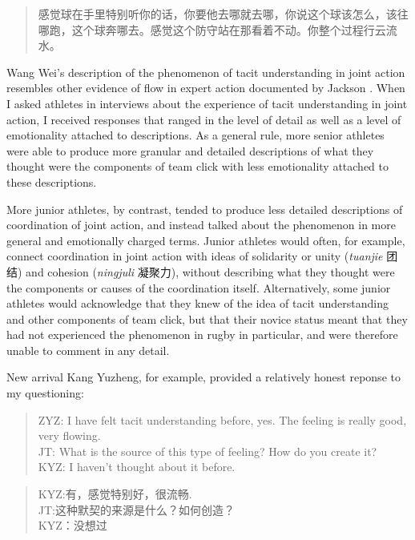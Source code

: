 \begin{CJK}{UTF8}{gbsn}
  \begin{quote}
    	感觉球在手里特别听你的话，你要他去哪就去哪，你说这个球该怎么，该往哪跑，这个球奔哪去。感觉这个防守站在那看着不动。你整个过程行云流水。
  \end{quote}

Wang Wei's description of the phenomenon of tacit understanding in joint action resembles other evidence of flow in expert action documented by Jackson \textcite{Jackson1992}.  When I asked athletes in interviews about the experience of tacit understanding in joint action, I received responses that ranged in the level of detail as well as a level of emotionality attached to descriptions.  As a general rule, more senior athletes were able to produce more granular and detailed descriptions of what they thought were the components of team click with less emotionality attached to these descriptions.

More junior athletes, by contrast, tended to produce less detailed descriptions of coordination of joint action, and instead talked about the phenomenon in more general and emotionally charged terms. Junior athletes would often, for example, connect coordination in joint action with ideas of solidarity or unity (\textit{tuanjie} 团结) and cohesion (\textit{ningjuli} 凝聚力), without describing what they thought were the components or causes of the coordination itself.  Alternatively, some junior athletes would acknowledge that they knew of the idea of tacit understanding and other components of team click, but that their novice status meant that they had not experienced the phenomenon in rugby in particular, and were therefore unable to comment in any detail.

New arrival Kang Yuzheng, for example, provided a relatively honest reponse to my questioning:

\begin{quote}
  ZYZ: I have felt tacit understanding before, yes.  The feeling is really good, very flowing. \\
  JT: What is the source of this type of feeling? How do you create it? \\
  KYZ: I haven't thought about it before.
\end{quote}

\begin{quote}
  KYZ:有，感觉特别好，很流畅. \\
  JT:这种默契的来源是什么？如何创造？\\
  KYZ：没想过
\end{quote}



\end{CJK}

